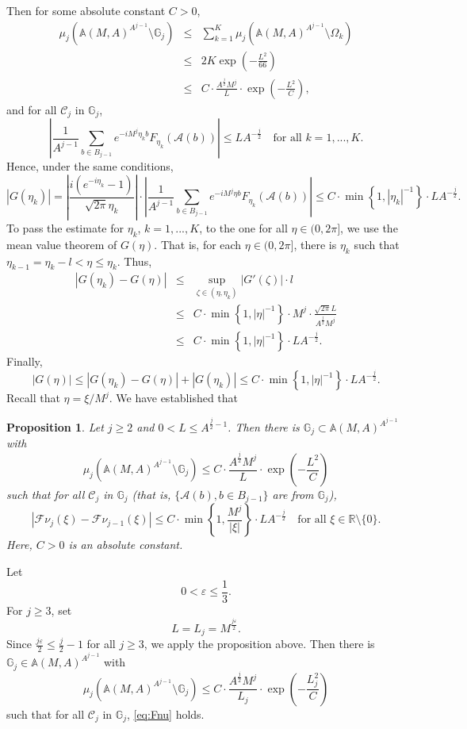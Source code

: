 \documentclass[12pt,reqno]{amsart}
\newcommand\Ab{\mathbb{A}}
\newcommand\Ac{\mathcal{A}}
\newcommand\Cc{\mathcal{C}}
\newcommand\Fc{\mathcal{F}}
\newcommand\Gb{\mathbb{G}}
\newcommand\R{\mathbb{R}}
\newcommand\ve{\varepsilon}
\theoremstyle{plain}
\newtheorem{prop}[thm]{\textbf{Proposition}}
\theoremstyle{remark}
\numberwithin{equation}{section}
\begin{document}
Then for some absolute constant $C>0$,
\begin{eqnarray*}
\mu_j\left(\Ab(M,A)^{A^{j-1}}\setminus\Gb_j\right)&\le&\sum_{k=1}^K\mu_j\left(\Ab(M,A)^{A^{j-1}}\setminus\Omega_k\right)\\
&\le&2K\exp\left(-\frac{L^2}{66}\right)\\
&\le&C\cdot\frac{A^{\frac j2}M^j}{L}\cdot\exp\left(-\frac{L^2}{C}\right),
\end{eqnarray*}
and for all $\Cc_j$ in $\Gb_j$,
$$\left|\frac{1}{A^{j-1}}\sum_{b\in B_{j-1}}e^{-iM^j\eta_k b}F_{\eta_k}\left(\Ac(b)\right)\right|\le LA^{-\frac j2}\quad\text{for all }k=1,...,K.$$
Hence, under the same conditions,
$$\left|G\left(\eta_k\right)\right|=\left|\frac{i\left(e^{-i\eta_k}-1\right)}{\sqrt{2\pi}\eta_k}\right|\cdot\left|\frac{1}{A^{j-1}}\sum_{b\in B_{j-1}}e^{-iM^j\eta b}F_{\eta_k}\left(\Ac(b)\right)\right|\le C\cdot\min\left\{1,\left|\eta_k\right|^{-1}\right\}\cdot LA^{-\frac j2}.$$
To pass the estimate for $\eta_k$, $k=1,...,K$, to the one for all $\eta\in(0,2\pi]$, we use the mean value theorem of $G(\eta)$. That is, for each $\eta\in(0,2\pi]$, there is $\eta_k$ such that $\eta_{k-1}=\eta_k-l<\eta\le\eta_k$. Thus,
\begin{eqnarray*}
\left|G\left(\eta_k\right)-G(\eta)\right|&\le&\sup_{\zeta\in\left(\eta,\eta_k\right)}|G'(\zeta)|\cdot l\\
&\le&C\cdot\min\left\{1,|\eta|^{-1}\right\}\cdot M^j\cdot\frac{\sqrt{2\pi}L}{A^{\frac j2}M^j}\\
&\le&C\cdot\min\left\{1,|\eta|^{-1}\right\}\cdot LA^{-\frac j2}.
\end{eqnarray*}
Finally,
$$|G(\eta)|\le\left|G\left(\eta_k\right)-G(\eta)\right|+\left|G\left(\eta_k\right)\right|\le C\cdot\min\left\{1,|\eta|^{-1}\right\}\cdot LA^{-\frac j2}.$$
Recall that $\eta=\xi/M^j$. We have established that
\begin{prop}
Let $j\ge2$ and $0<L\le A^{\frac j2-1}$. Then there is $\Gb_j\subset\Ab(M,A)^{A^{j-1}}$ with
$$\mu_j\left(\Ab(M,A)^{A^{j-1}}\setminus\Gb_j\right)\le C\cdot\frac{A^{\frac j2}M^j}{L}\cdot\exp\left(-\frac{L^2}{C}\right)$$
such that for all $\Cc_j$ in $\Gb_j$ (that is, $\{\Ac(b),b\in B_{j-1}\}$ are from $\Gb_j$),
\begin{equation}\label{eq:Fnu}
\left|\Fc\nu_j(\xi)-\Fc\nu_{j-1}(\xi)\right|\le C\cdot\min\left\{1,\frac{M^j}{|\xi|}\right\}\cdot LA^{-\frac j2}\quad\text{for all }\xi\in\R\setminus\{0\}.
\end{equation}
Here, $C>0$ is an absolute constant.
\end{prop}
Let
$$0<\ve\le\frac13.$$
For $j\ge3$, set 
$$L=L_j=M^{\frac{j\ve}{2}}.$$
Since $\frac{j\ve}{2}\le\frac j2-1$ for all $j\ge3$, we apply the proposition above. Then there is $\Gb_j\in\Ab(M,A)^{A^{j-1}}$ with
$$\mu_j\left(\Ab(M,A)^{A^{j-1}}\setminus\Gb_j\right)\le C\cdot\frac{A^{\frac j2}M^j}{L_j}\cdot\exp\left(-\frac{L_j^2}{C}\right)$$
such that for all $\Cc_j$ in $\Gb_j$, \eqref{eq:Fnu} holds. 
\end{document}
